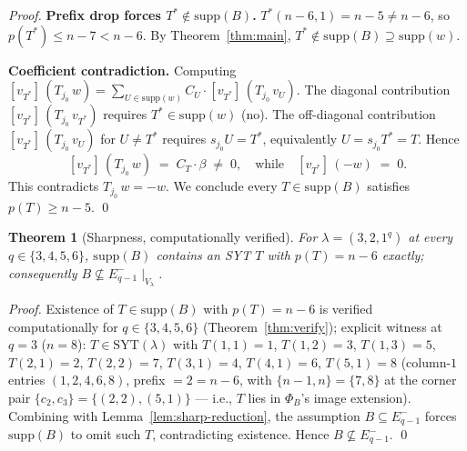 \documentclass[11pt]{article}
\newtheorem{theorem}{Theorem}
\theoremstyle{definition}
\newcommand{\supp}{\mathrm{supp}}
\newcommand{\SYT}{\mathrm{SYT}}
\begin{document}
\begin{proof}
\medskip\textbf{Prefix drop forces $T^* \notin \supp(B)$.}
$T^*(n - 6, 1) = n - 5 \ne n - 6$, so $p(T^*) \le n - 7 < n - 6$.
By Theorem~\ref{thm:main}, $T^* \notin \supp(B) \supseteq \supp(w)$.

\medskip\textbf{Coefficient contradiction.}  Computing
$[v_{T^*}]\,(T_{j_0}\,w) = \sum_{U \in \supp(w)} C_U \cdot
[v_{T^*}]\,(T_{j_0}\,v_U)$.  The diagonal contribution $[v_{T^*}]\,
(T_{j_0}\,v_{T^*})$ requires $T^* \in \supp(w)$ (no).  The
off-diagonal contribution $[v_{T^*}]\,(T_{j_0}\,v_U)$ for $U \ne T^*$
requires $s_{j_0} U = T^*$, equivalently $U = s_{j_0} T^* = T$.
Hence
\[
   [v_{T^*}]\,(T_{j_0}\,w) \;=\; C_T \cdot \beta \;\ne\; 0,
   \quad\text{while}\quad [v_{T^*}]\,(-w) \;=\; 0.
\]
This contradicts $T_{j_0}\,w = -w$.  We conclude every
$T \in \supp(B)$ satisfies $p(T) \ge n - 5$.
\qed
\end{proof}

\begin{theorem}[Sharpness, computationally verified]\label{thm:sharp}
For $\lambda = (3, 2, 1^q)$ at every $q \in \{3, 4, 5, 6\}$,
$\supp(B)$ contains an SYT $T$ with $p(T) = n - 6$ exactly;
consequently $B \not\subseteq E_{q - 1}^-\!\mid_{V_\lambda}$.
\end{theorem}

\begin{proof}
Existence of $T \in \supp(B)$ with $p(T) = n - 6$ is verified
computationally for $q \in \{3, 4, 5, 6\}$
(Theorem~\ref{thm:verify}); explicit witness at $q = 3$ ($n = 8$):
$T \in \SYT(\lambda)$ with $T(1, 1) = 1$, $T(1, 2) = 3$,
$T(1, 3) = 5$, $T(2, 1) = 2$, $T(2, 2) = 7$, $T(3, 1) = 4$,
$T(4, 1) = 6$, $T(5, 1) = 8$ (column-$1$ entries $(1, 2, 4, 6, 8)$,
prefix $= 2 = n - 6$, with $\{n - 1, n\} = \{7, 8\}$ at the corner
pair $\{c_2, c_3\} = \{(2, 2), (5, 1)\}$ — i.e., $T$ lies in
$\Phi_B$'s image extension).  Combining with
Lemma~\ref{lem:sharp-reduction}, the assumption $B \subseteq
E_{q - 1}^-$ forces $\supp(B)$ to omit such $T$, contradicting
existence.  Hence $B \not\subseteq E_{q - 1}^-$.
\qed
\end{proof}
\end{document}
